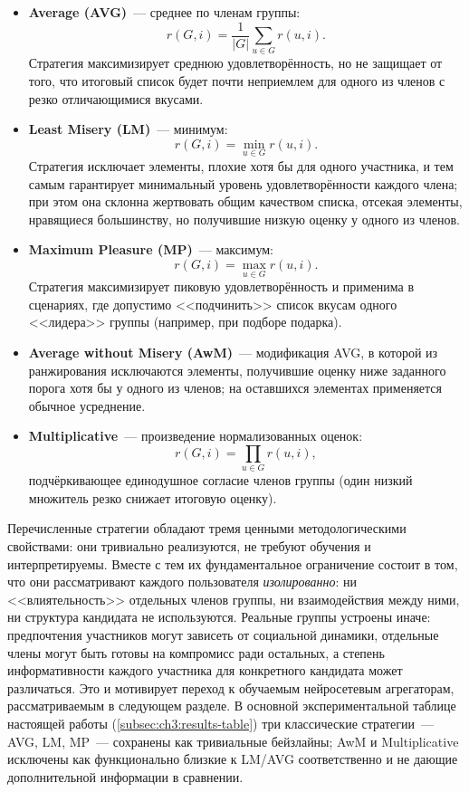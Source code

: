 \begin{itemize}
    \item \textbf{Average (AVG)}~--- среднее по членам группы:
    \[
        r(G, i) = \frac{1}{|G|} \sum_{u \in G} r(u, i).
    \]
    Стратегия максимизирует среднюю удовлетворённость, но не защищает от того, что итоговый список будет почти неприемлем для одного из членов с резко отличающимися вкусами.

    \item \textbf{Least Misery (LM)}~--- минимум:
    \[
        r(G, i) = \min_{u \in G} r(u, i).
    \]
    Стратегия исключает элементы, плохие хотя бы для одного участника, и тем самым гарантирует минимальный уровень удовлетворённости каждого члена; при этом она склонна жертвовать общим качеством списка, отсекая элементы, нравящиеся большинству, но получившие низкую оценку у одного из членов.

    \item \textbf{Maximum Pleasure (MP)}~--- максимум:
    \[
        r(G, i) = \max_{u \in G} r(u, i).
    \]
    Стратегия максимизирует пиковую удовлетворённость и применима в сценариях, где допустимо <<подчинить>> список вкусам одного <<лидера>> группы (например, при подборе подарка).

    \item \textbf{Average without Misery (AwM)}~--- модификация AVG, в которой из ранжирования исключаются элементы, получившие оценку ниже заданного порога хотя бы у одного из членов; на оставшихся элементах применяется обычное усреднение.

    \item \textbf{Multiplicative}~--- произведение нормализованных оценок:
    \[
        r(G, i) = \prod_{u \in G} r(u, i),
    \]
    подчёркивающее единодушное согласие членов группы (один низкий множитель резко снижает итоговую оценку).
\end{itemize}

Перечисленные стратегии обладают тремя ценными методологическими свойствами: они тривиально реализуются, не требуют обучения и интерпретируемы. Вместе с тем их фундаментальное ограничение состоит в том, что они рассматривают каждого пользователя \emph{изолированно}: ни <<влиятельность>> отдельных членов группы, ни взаимодействия между ними, ни структура кандидата не используются. Реальные группы устроены иначе: предпочтения участников могут зависеть от социальной динамики, отдельные члены могут быть готовы на компромисс ради остальных, а степень информативности каждого участника для конкретного кандидата может различаться. Это и мотивирует переход к обучаемым нейросетевым агрегаторам, рассматриваемым в следующем разделе. В основной экспериментальной таблице настоящей работы (\ref{subsec:ch3:results-table}) три классические стратегии~--- AVG, LM, MP~--- сохранены как тривиальные бейзлайны; AwM и Multiplicative исключены как функционально близкие к LM/AVG соответственно и не дающие дополнительной информации в сравнении.

